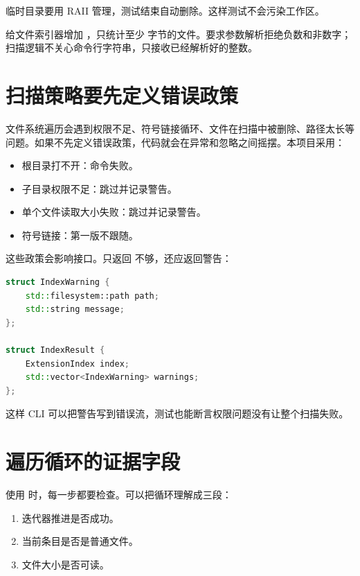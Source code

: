 临时目录要用 RAII 管理，测试结束自动删除。这样测试不会污染工作区。

\begin{exercisebox}
给文件索引器增加 ，只统计至少  字节的文件。要求参数解析拒绝负数和非数字；扫描逻辑不关心命令行字符串，只接收已经解析好的整数。
\end{exercisebox}

\section{扫描策略要先定义错误政策}

文件系统遍历会遇到权限不足、符号链接循环、文件在扫描中被删除、路径太长等问题。如果不先定义错误政策，代码就会在异常和忽略之间摇摆。本项目采用：

\begin{itemize}
  \item 根目录打不开：命令失败。
  \item 子目录权限不足：跳过并记录警告。
  \item 单个文件读取大小失败：跳过并记录警告。
  \item 符号链接：第一版不跟随。
\end{itemize}

这些政策会影响接口。只返回  不够，还应返回警告：

\begin{lstlisting}[language=C++,caption={索引结果带警告}]
struct IndexWarning {
    std::filesystem::path path;
    std::string message;
};

struct IndexResult {
    ExtensionIndex index;
    std::vector<IndexWarning> warnings;
};
\end{lstlisting}

这样 CLI 可以把警告写到错误流，测试也能断言权限问题没有让整个扫描失败。

\section{遍历循环的证据字段}

 使用  时，每一步都要检查。可以把循环理解成三段：

\begin{enumerate}
  \item 迭代器推进是否成功。
  \item 当前条目是否是普通文件。
  \item 文件大小是否可读。
\end{enumerate}

